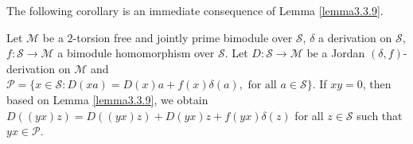 \documentclass{arxiv}
\begin{document}
The following corollary is an immediate consequence of Lemma \ref{lemma3.3.9}.

\begin{corollary}\label{cor3.3.2}
     Let $\mathcal{M}$ be a $2$-torsion free and jointly prime bimodule over $\mathcal{S}$, $\delta$ a derivation on $\mathcal{S}$, $f : \mathcal{S} \rightarrow \mathcal{M}$ a bimodule homomorphism over $\mathcal{S}$. Let $D:\mathcal{S} \rightarrow \mathcal{M}$ be a Jordan $(\delta,f)$-derivation on $\mathcal{M}$ and $\mathcal{P}=\{ x \in \mathcal{S} : D(xa) = D(x)a+f(x)\delta(a), \text{ for all } a \in \mathcal{S}\}$. If $xy=0$, then based on Lemma \ref{lemma3.3.9}, we obtain $D((yx)z)=D((yx)z)+D(yx)z+f(yx)\delta(z)$ for all $z \in \mathcal{S}$ such that $yx \in \mathcal{P}$.
\end{corollary}
\end{document}
